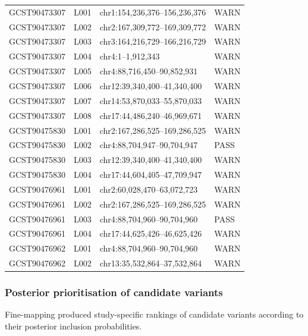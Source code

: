 \documentclass[11pt,a4paper]{article}
\begin{document}
\begin{longtable}{@{}llp{7.0cm}l@{}}
\midrule

GCST90473307 & L001 &
chr1:154,236,376--156,236,376 & WARN \\
GCST90473307 & L002 &
chr2:167,309,772--169,309,772 & WARN \\
GCST90473307 & L003 &
chr3:164,216,729--166,216,729 & WARN \\
GCST90473307 & L004 &
chr4:1--1,912,343 & WARN \\
GCST90473307 & L005 &
chr4:88,716,450--90,852,931 & WARN \\
GCST90473307 & L006 &
chr12:39,340,400--41,340,400 & WARN \\
GCST90473307 & L007 &
chr14:53,870,033--55,870,033 & WARN \\
GCST90473307 & L008 &
chr17:44,486,240--46,969,671 & WARN \\

\midrule

GCST90475830 & L001 &
chr2:167,286,525--169,286,525 & WARN \\
GCST90475830 & L002 &
chr4:88,704,947--90,704,947 & PASS \\
GCST90475830 & L003 &
chr12:39,340,400--41,340,400 & WARN \\
GCST90475830 & L004 &
chr17:44,604,405--47,709,947 & WARN \\

\midrule

GCST90476961 & L001 &
chr2:60,028,470--63,072,723 & WARN \\
GCST90476961 & L002 &
chr2:167,286,525--169,286,525 & WARN \\
GCST90476961 & L003 &
chr4:88,704,960--90,704,960 & PASS \\
GCST90476961 & L004 &
chr17:44,625,426--46,625,426 & WARN \\

\midrule

GCST90476962 & L001 &
chr4:88,704,960--90,704,960 & WARN \\
GCST90476962 & L002 &
chr13:35,532,864--37,532,864 & WARN \\

\end{longtable}
\endgroup


\subsubsection{Posterior prioritisation of candidate variants}

Fine-mapping produced study-specific rankings of
candidate variants according to their posterior
inclusion probabilities.
\end{document}
